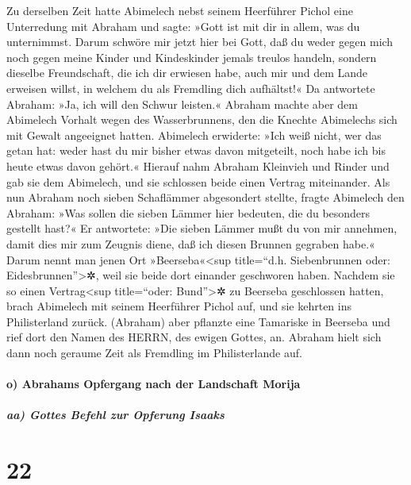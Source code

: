  Zu derselben Zeit hatte Abimelech nebst seinem
Heerführer Pichol eine Unterredung mit Abraham und sagte: »Gott ist mit
dir in allem, was du unternimmst.  Darum schwöre mir
jetzt hier bei Gott, daß du weder gegen mich noch gegen meine Kinder und
Kindeskinder jemals treulos handeln, sondern dieselbe Freundschaft, die
ich dir erwiesen habe, auch mir und dem Lande erweisen willst, in
welchem du als Fremdling dich aufhältst!«  Da antwortete
Abraham: »Ja, ich will den Schwur leisten.«  Abraham
machte aber dem Abimelech Vorhalt wegen des Wasserbrunnens, den die
Knechte Abimelechs sich mit Gewalt angeeignet hatten. 
Abimelech erwiderte: »Ich weiß nicht, wer das getan hat: weder hast du
mir bisher etwas davon mitgeteilt, noch habe ich bis heute etwas davon
gehört.«  Hierauf nahm Abraham Kleinvieh und Rinder und
gab sie dem Abimelech, und sie schlossen beide einen Vertrag
miteinander.  Als nun Abraham noch sieben Schaflämmer
abgesondert stellte,  fragte Abimelech den Abraham: »Was
sollen die sieben Lämmer hier bedeuten, die du besonders gestellt hast?«
 Er antwortete: »Die sieben Lämmer mußt du von mir
annehmen, damit dies mir zum Zeugnis diene, daß ich diesen Brunnen
gegraben habe.«  Darum nennt man jenen Ort
»Beerseba«\textless sup title=``d.h. Siebenbrunnen oder:
Eidesbrunnen''\textgreater✲, weil sie beide dort einander geschworen
haben.  Nachdem sie so einen Vertrag\textless sup
title=``oder: Bund''\textgreater✲ zu Beerseba geschlossen hatten, brach
Abimelech mit seinem Heerführer Pichol auf, und sie kehrten ins
Philisterland zurück.  (Abraham) aber pflanzte eine
Tamariske in Beerseba und rief dort den Namen des HERRN, des ewigen
Gottes, an.  Abraham hielt sich dann noch geraume Zeit
als Fremdling im Philisterlande auf.

\hypertarget{o-abrahams-opfergang-nach-der-landschaft-morija}{%
\paragraph{o) Abrahams Opfergang nach der Landschaft
Morija}\label{o-abrahams-opfergang-nach-der-landschaft-morija}}

\hypertarget{aa-gottes-befehl-zur-opferung-isaaks}{%
\subparagraph{aa) Gottes Befehl zur Opferung
Isaaks}\label{aa-gottes-befehl-zur-opferung-isaaks}}

\hypertarget{section-21}{%
\section{22}\label{section-21}}

